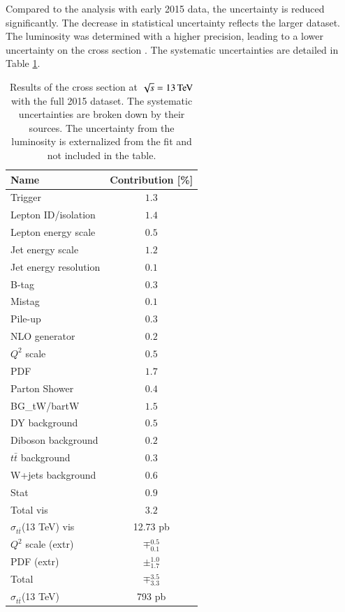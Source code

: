 Compared to the analysis with early 2015 data, the uncertainty is reduced significantly. The decrease in statistical uncertainty reflects the larger dataset. The luminosity was determined with a higher precision, leading to a lower
uncertainty on the \ttbar cross section \cite{CMS-PAS-LUM-15-001}. The systematic uncertainties are detailed in Table \ref{tab:res_2015ana}.

\begin{table}[htbp!]
\begin{center}
\caption{Results of the \ttbar cross section at $\sqrt{s}= 13 \,\text{Te\hspace{-.08em}V}$ with the full 2015 dataset. The systematic uncertainties are broken down by their sources. The uncertainty from the luminosity is externalized from the fit
and not included in the table.  }
\label{tab:res_2015ana}
\begin{tabular}{ l | c }
 \hline
Name  & Contribution [\%] \\ \hline
Trigger & ${1.3}$ \\
Lepton ID/isolation & ${1.4}$ \\
Lepton energy scale & ${0.5}$ \\
Jet energy scale & ${1.2}$ \\
Jet energy resolution  & ${0.1}$ \\
B-tag & ${0.3}$ \\
Mistag & ${0.1}$ \\
Pile-up & ${0.3}$ \\
NLO generator & ${0.2}$ \\
$Q^{2}$ scale  & ${0.5}$ \\
PDF & ${1.7}$ \\
Parton Shower & ${0.4}$ \\
BG\_tW/bar{t}W & ${1.5}$ \\
DY background & ${0.5}$ \\
Diboson background  & ${0.2}$ \\
$t\bar{t}$ background & ${0.3}$ \\
W+jets background & ${0.6}$ \\
Stat & ${0.9}$ \\
Total vis & ${3.2}$ \\ \hline
$\sigma_{t\bar{t}}$(13 TeV) vis & 12.73 pb \\ \hline
$Q^{2}$ scale (extr) & $\mp^{0.5}_{0.1}$ \\
PDF (extr) & $\pm^{1.0}_{1.7}$ \\ \hline
Total & $\mp^{3.5}_{3.3}$ \\ \hline
$\sigma_{t\bar{t}}$(13 TeV) & 793 pb \\ \hline \hline
\end{tabular}
\end{center}
\end{table}

